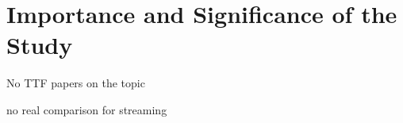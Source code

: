 \section{Importance and Significance of the Study}

No TTF papers on the topic

no real comparison for streaming 